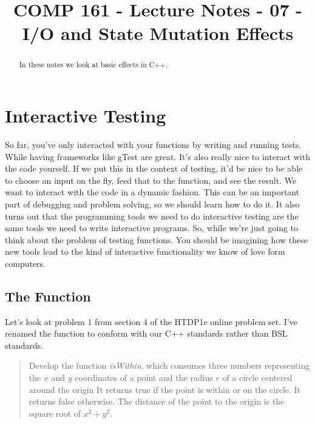 \documentclass[]{tufte-handout}
\title{COMP 161 - Lecture Notes - 07 - I/O and State Mutation Effects}
\begin{document}
 
\maketitle

\begin{abstract}
In these notes we look at basic effects in C++. 

\end{abstract}

\section{Interactive Testing}

So far, you've only interacted with your functions by writing and running tests. While having frameworks like gTest are great. It's also really nice to interact with the code yourself. If we put this in the context of testing, it'd be nice to be able to choose an input on the fly, feed that to the function, and see the result. We want to interact with the code in a dynamic fashion. This can be an important part of debugging and problem solving, so we should learn how to do it. It also turns out that the programming tools we need to do interactive testing are the same tools we need to write interactive programs. So, while we're just going to think about the problem of testing functions. You should be imagining how these new tools lead to the kind of interactive functionality we know of love form computers. 

\subsection{The Function}

Let's look at problem 1 from section 4 of the HTDP1e online problem set. I've renamed the function to conform with our C++ standards rather than BSL standards. 

\begin{framed}
\begin{quote}
Develop the function \textit{isWithin}, which consumes three numbers representing the $x$ and $y$ coordinates of a point and the radius $r$ of a circle centered around the origin It returns true if the point is within or on the circle. It returns false otherwise. The distance of the point to the origin is the square root of $x^2 + y^2$.
\end{quote}
\end{framed}
\end{document}
